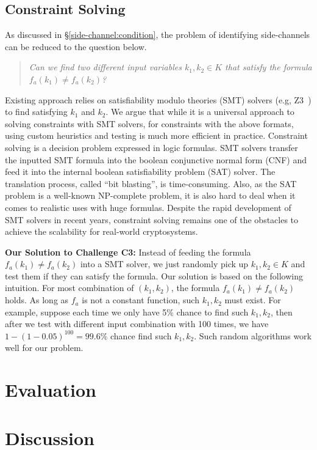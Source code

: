 \subsection{Constraint Solving}
As discussed in \S\ref{side-channel:condition}, the problem of identifying
side-channels can be reduced to the question below.

\begin{quote}
      \textit{Can we find two different input variables $k_1, k_2 \in K$ that
            satisfy the formula $f_a(k_1) \neq f_a(k_2)$?}
\end{quote}

Existing approach relies on satisfiability modulo theories (SMT) solvers (e.g,
Z3~\cite{DeMoura:2008:ZES:1792734.1792766}) to find satisfying $k_1$ and $k_2$.
We argue that while it is a universal approach to solving constraints with SMT
solvers, for constraints with the above formats, using custom heuristics and
testing is much more efficient in practice. Constraint solving is a decision
problem expressed in logic formulas. SMT solvers transfer the inputted SMT
formula into the boolean conjunctive normal form (CNF) and feed it into the
internal boolean satisfiability problem (SAT) solver. The translation process,
called ``bit blasting'', is time-consuming. Also, as the SAT problem is a
well-known NP-complete problem, it is also hard to deal when it comes to
realistic uses with huge formulas. Despite the rapid development of SMT solvers
in recent years, constraint solving remains one of the obstacles to achieve the
scalability for real-world cryptosystems.

\vspace*{2pt}
\textbf{Our Solution to Challenge C3:}
Instead of feeding the formula $f_a(k_1) \neq f_a(k_2)$ into a SMT solver, we
just randomly pick up $k_1, k_2 \in K$ and test them if they can satisfy the
formula. Our solution is based on the following intuition. For most combination
of $(k_{1}, k_{2} )$, the formula $f_a(k_1) \neq f_a(k_2)$ holds. As long as
$f_a$ is not a constant function, such $k_1, k_2$ must exist. For example,
suppose each time we only have 5\% chance to find such $k_1, k_2$, then after we
test with different input combination with 100 times, we have $1 -
(1-0.05)^{100} = 99.6\%$ chance find such $k_1, k_2$. Such random algorithms
work well for our problem.
\section{Evaluation}

\section{Discussion}

